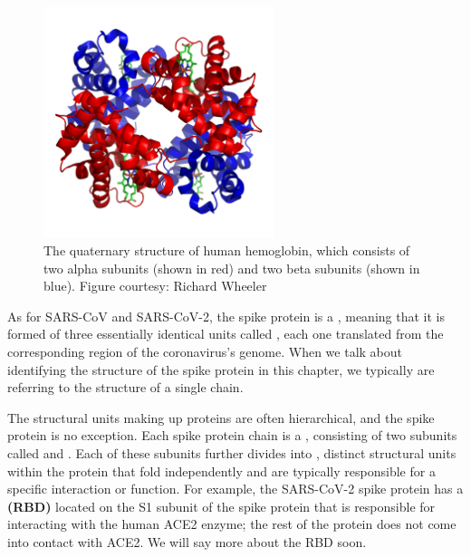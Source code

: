 \begin{figure}[h]
	\centering
	\mySfFamily
	\includegraphics[width = 0.6\textwidth]{../images/hemoglobin_quaternary_structure.png}
	\caption{The quaternary structure of human hemoglobin, which consists of two alpha subunits (shown in red) and two beta subunits (shown in blue). Figure courtesy: Richard Wheeler}
	\label{fig:hemoglobin_quaternary_structure}
\end{figure}

As for SARS-CoV and SARS-CoV-2, the spike protein is a , meaning that it is formed of three essentially identical units called , each one translated from the corresponding region of the coronavirus's genome. When we talk about identifying the structure of the spike protein in this chapter, we typically are referring to the structure of a single chain.

The structural units making up proteins are often hierarchical, and the spike protein is no exception. Each spike protein chain is a , consisting of two subunits called  and . Each of these subunits further divides into , distinct structural units within the protein that fold independently and are typically responsible for a specific interaction or function. For example, the SARS-CoV-2 spike protein has a  \textbf{(RBD)} located on the S1 subunit of the spike protein that is responsible for interacting with the human ACE2 enzyme; the rest of the protein does not come into contact with ACE2. We will say more about the RBD soon.

\FloatBarrier
{}
